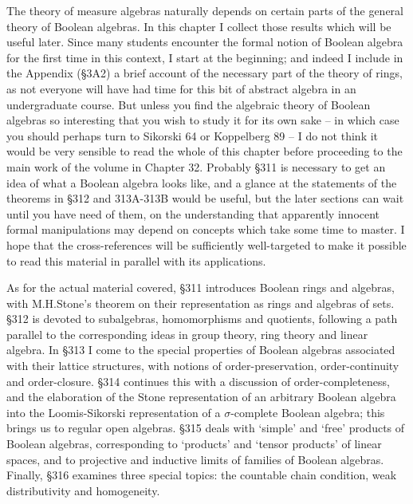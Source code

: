 
\def\chaptername{Boolean algebras}
\def\sectionname{Introduction}


The theory of measure algebras naturally depends on certain parts of the
general theory of Boolean algebras.   In this chapter I collect those
results which will be useful later.   Since many students encounter the
formal notion of Boolean algebra for the first time in this context, I
start at the beginning;  and indeed I include in the Appendix
(\S3A2) a brief account of the necessary part of the theory of
rings, as not everyone will have had time for this bit of abstract
algebra in an undergraduate course.   But unless you find the algebraic
theory of Boolean algebras so interesting that you wish to study it for
its own sake -- in which case you should perhaps turn to {\smc Sikorski
64} or {\smc Koppelberg 89} -- I do not think it would be very sensible
to read the whole of this chapter before proceeding to the main work of
the volume in Chapter 32.   Probably \S311 is necessary to get an idea
of what a Boolean algebra looks like, and a glance at the statements of
the theorems in \S312 and 313A-313B
would be useful, but the later sections can
wait until you have need of them, on the understanding that apparently
innocent formal manipulations may depend on concepts which take some
time to master.   I hope that the cross-references
will be sufficiently well-targeted to make it possible to read this
material in parallel with its applications.

As for the actual material covered, \S311 introduces Boolean rings and
algebras, with M.H.Stone's theorem on their representation as rings and
algebras of sets.   \S312 is devoted to subalgebras, homomorphisms and
quotients, following a path parallel to the corresponding ideas in group
theory, ring theory and linear algebra.   In \S313 I come to the special
properties of Boolean algebras associated with their lattice
structures, with notions of order-preservation, order-continuity and
order-closure.   \S314 continues this with a discussion of
order-completeness, and the elaboration of the Stone representation of an
arbitrary Boolean algebra into
the Loomis-Sikorski representation of a $\sigma$-complete Boolean algebra;
this brings us to regular open algebras.   \S315 deals with `simple' and
`free' products of Boolean algebras, corresponding to `products' and
`tensor products' of linear spaces, and to projective and inductive limits
of families of Boolean algebras.   Finally, \S316 examines three special
topics:  the countable chain condition, weak distributivity and
homogeneity.

\discrpage

